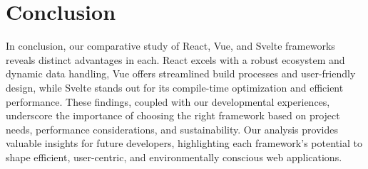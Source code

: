 \section{Conclusion}

In conclusion, our comparative study of React, Vue, and Svelte frameworks reveals distinct advantages in each. React excels with a robust ecosystem and dynamic data handling, Vue offers streamlined build processes and user-friendly design, while Svelte stands out for its compile-time optimization and efficient performance. These findings, coupled with our developmental experiences, underscore the importance of choosing the right framework based on project needs, performance considerations, and sustainability. Our analysis provides valuable insights for future developers, highlighting each framework's potential to shape efficient, user-centric, and environmentally conscious web applications.
